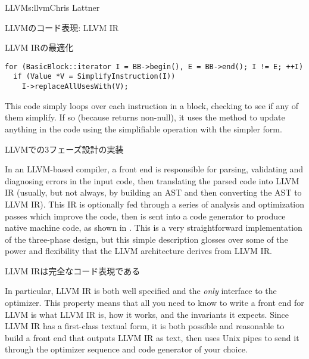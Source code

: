 \begin{aosachapter}{LLVM}{s:llvm}{Chris Lattner}
\begin{aosasect1}{LLVMのコード表現: LLVM IR}
\begin{aosasect2}{LLVM IRの最適化}
\begin{verbatim}
for (BasicBlock::iterator I = BB->begin(), E = BB->end(); I != E; ++I)
  if (Value *V = SimplifyInstruction(I))
    I->replaceAllUsesWith(V);
\end{verbatim}

\noindent This code simply loops over each instruction in a block, checking to
see if any of them simplify.  If so (because
 returns non-null), it uses the
 method to update anything in the code using
the simplifiable operation with the simpler form.

\end{aosasect2}

\end{aosasect1}

\begin{aosasect1}{LLVMでの3フェーズ設計の実装}

In an LLVM-based compiler, a front end is responsible for parsing,
validating and diagnosing errors in the input code, then translating
the parsed code into LLVM IR (usually, but not always, by building an
AST and then converting the AST to LLVM IR).  This IR is optionally
fed through a series of analysis and optimization passes which improve
the code, then is sent into a code generator to produce native machine
code, as shown in . This is a very
straightforward implementation of the three-phase design, but this
simple description glosses over some of the power and flexibility
that the LLVM architecture derives from LLVM IR.


\begin{aosasect2}{LLVM IRは完全なコード表現である}

In particular, LLVM IR is both well specified and the \emph{only}
interface to the optimizer.  This property means that all you need to
know to write a front end for LLVM is what LLVM IR is, how it works,
and the invariants it expects.  Since LLVM IR has a first-class
textual form, it is both possible and reasonable to build a front end
that outputs LLVM IR as text, then uses Unix pipes to send it through
the optimizer sequence and code generator of your choice.


\end{aosasect2}
\end{aosasect1}
\end{aosachapter}
